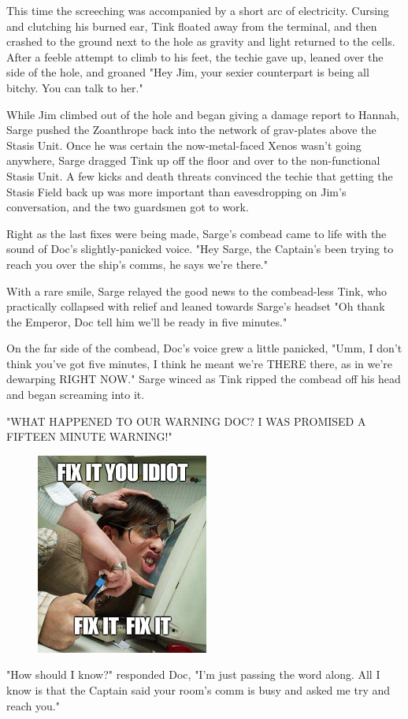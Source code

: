 This time the screeching was accompanied by a short arc of electricity. 
Cursing and clutching his burned ear, Tink floated away from the terminal, and then crashed to the ground next to the hole as gravity and light returned to the cells. 
After a feeble attempt to climb to his feet, the techie gave up, leaned over the side of the hole, and groaned "Hey Jim, your sexier counterpart is being all bitchy. 
You can talk to her."

While Jim climbed out of the hole and began giving a damage report to Hannah, Sarge pushed the Zoanthrope back into the network of grav-plates above the Stasis Unit. 
Once he was certain the now-metal-faced Xenos wasn't going anywhere, Sarge dragged Tink up off the floor and over to the non-functional Stasis Unit. 
A few kicks and death threats convinced the techie that getting the Stasis Field back up was more important than eavesdropping on Jim's conversation, and the two guardsmen got to work. 


Right as the last fixes were being made, Sarge's combead came to life with the sound of Doc's slightly-panicked voice. 
"Hey Sarge, the Captain's been trying to reach you over the ship's comms, he says we're there."

With a rare smile, Sarge relayed the good news to the combead-less Tink, who practically collapsed with relief and leaned towards Sarge's headset "Oh thank the Emperor, Doc tell him we'll be ready in five minutes." 

On the far side of the combead, Doc's voice grew a little panicked, "Umm, I don't think you've got five minutes, I think he meant we're THERE there, as in we're dewarping RIGHT NOW." Sarge winced as Tink ripped the combead off his head and began screaming into it.

"WHAT HAPPENED TO OUR WARNING DOC? 
I WAS PROMISED A FIFTEEN MINUTE WARNING!"

\begin{figure}
	\begin{center}
		\includegraphics[width=\figwidth]{pics/13/11.png}
	\end{center}
\end{figure}
"How should I know?" responded Doc, "I'm just passing the word along. 
All I know is that the Captain said your room's comm is busy and asked me try and reach you."

